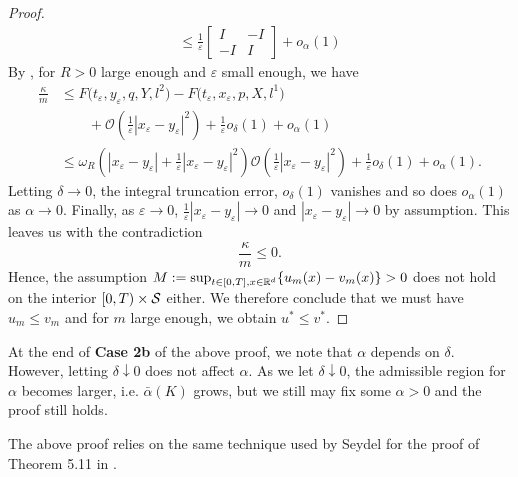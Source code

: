 \begin{proof}
\begin{align*}
        \leq 
        \frac{1}{\varepsilon} 
        \begin{bmatrix}
            I & -I \\
            -I & I
        \end{bmatrix} + o_\alpha(1)
    \end{align*}
    By , for $R>0$ large enough and $\varepsilon$ small enough, we have
    \begin{align*}
        \frac{\kappa}{m} &\leq  F\big(t_\varepsilon, y_\varepsilon, q, Y, l^2 \big) - F\big(t_\varepsilon, x_\varepsilon, p, X, l^1 \big) \\
        & \qquad + \mathcal{O}\left( \frac{1}{\varepsilon} |x_\varepsilon-y_\varepsilon|^2 \right)+ \frac{1}{\varepsilon} o_\delta(1) + o_\alpha(1) \\
        & \leq \omega_R \left( |x_\varepsilon-y_\varepsilon| + \frac{1}{\varepsilon} |x_\varepsilon-y_\varepsilon|^2 \right) \mathcal O \left( \frac 1 \varepsilon |x_\varepsilon-y_\varepsilon|^2 \right) + \frac 1 \varepsilon o_\delta(1) + o_\alpha(1).
    \end{align*}
    Letting $\delta \rightarrow 0$, the integral truncation error, $o_\delta(1)$ vanishes and so does $o_\alpha(1)$ as $\alpha \rightarrow 0$. Finally, as $\varepsilon \rightarrow 0$, $\frac{1}{\varepsilon}|x_\varepsilon-y_\varepsilon| \rightarrow 0$ and $|x_\varepsilon-y_\varepsilon| \rightarrow 0$ by assumption. This leaves us with the contradiction
    \begin{equation*}
        \frac{\kappa}{m} \leq 0.
    \end{equation*}
    Hence, the assumption $M:= \sup_{t \in [0,T], x \in \mathbb{R}^d} \{u_m(x)-v_m(x)\}>0$ does not hold on the interior $[0,T)\times \mathcal{S}$ either. We therefore conclude that we must have $u_m \leq v_m$ and for $m$ large enough, we obtain $u^* \leq v^*$.
\end{proof}
\begin{remark}
    At the end of \textbf{Case 2b} of the above proof, we note that $\alpha$ depends on $\delta$. However, letting $\delta \downarrow 0$ does not affect $\alpha$. As we let $\delta \downarrow 0$, the admissible region for $\alpha$ becomes larger, i.e. $\bar \alpha(K)$ grows, but we still may fix some $\alpha > 0$ and the proof still holds.
\end{remark}
\begin{remark}
    The above proof relies on the same technique used by Seydel for the proof of Theorem 5.11 in \cite{seydel2010generalexistenceuniquenessviscosity}. 
\end{remark}

